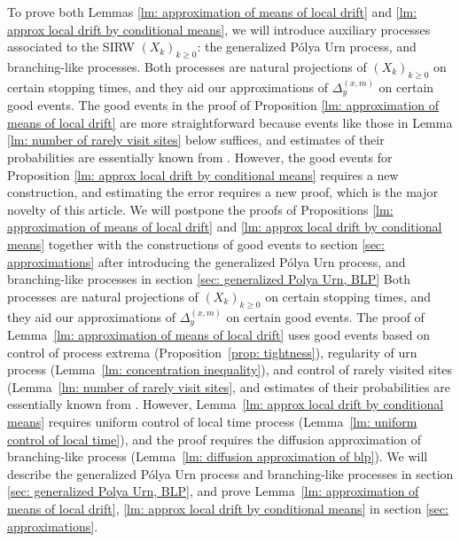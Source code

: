 \documentclass[twoside,12pt,a4paper]{article}
\numberwithin{equation}{section}
\newcommand\TBD{\textcolor{red}{TBD.}}
\newcommand{\edt}[1]{\textcolor{red}{#1}} %
\begin{document}
	To prove both Lemmas \ref{lm: approximation of means of local drift} and \ref{lm: approx local drift by conditional means}, we will introduce auxiliary processes associated to the SIRW $(X_k)_{k\geq 0}$: the generalized P\'{o}lya Urn process, and branching-like processes. Both processes are natural projections of $(X_k)_{k\geq 0}$ on certain stopping times, and they aid our approximations of $\Delta_{y}^{(x,m)}$ on certain good events. The good events in the proof of Proposition \ref{lm: approximation of means of local drift} are more straightforward because events like those in Lemma \ref{lm: number of rarely visit sites} below suffices, and estimates of their probabilities are essentially known from \cite{KMP22}. However, the good events for Proposition \ref{lm: approx local drift by conditional means} requires a new construction, and estimating the error requires a new proof, which is the major novelty of this article. We will postpone the proofs of Propositions \ref{lm: approximation of means of local drift} and \ref{lm: approx local drift by conditional means} together with the constructions of good events to section \ref{sec: approximations} after introducing the generalized P\'{o}lya Urn process, and branching-like processes in section \ref{sec: generalized Polya Urn, BLP}
	Both processes are natural projections of $(X_k)_{k\geq 0}$ on certain stopping times, and they aid our approximations of $\Delta_{y}^{(x,m)}$ on certain good events. 
	The proof of Lemma~\ref{lm: approximation of means of local drift} uses good events based on control of process extrema (Proposition~\ref{prop: tightness}), regularity of urn process (Lemma~\ref{lm: concentration inequality}), and control of rarely visited sites (Lemma~\ref{lm: number of rarely visit sites}, and estimates of their probabilities are essentially known from \cite{KMP22}. 
	However, Lemma~\ref{lm: approx local drift by conditional means} requires uniform control of local time process (Lemma~\ref{lm: uniform control of local time}), and the proof requires the diffusion approximation of branching-like process (Lemma~\ref{lm: diffusion approximation of blp}).
	We will describe the generalized P\'{o}lya Urn process and branching-like processes in section \ref{sec: generalized Polya Urn, BLP}, and prove Lemma~\ref{lm: approximation of means of local drift}, \ref{lm: approx local drift by conditional means} in section \ref{sec: approximations}.
	\vspace{1em}
	
\end{document}
